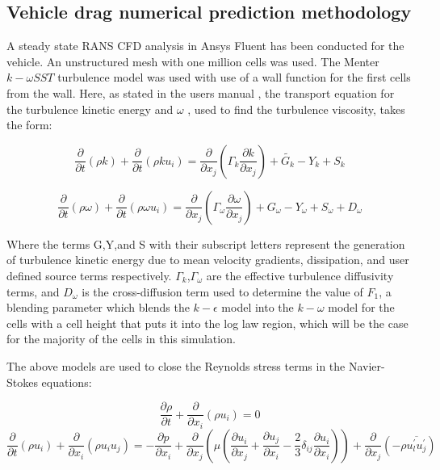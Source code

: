\subsection{Vehicle drag numerical prediction methodology}

A steady state RANS CFD analysis in Ansys Fluent has been conducted for the vehicle. An unstructured mesh with one million cells was used. The Menter $k-\omega SST$ turbulence model was used with use of a wall function for the first cells from the wall. Here, as stated in the users manual \cite{usrguide}, the transport equation for the turbulence kinetic energy and $\omega$ , used to find the turbulence viscosity, takes the form:

\begin{equation}
\frac{\partial}{\partial t}(\rho k)+\frac{\partial}{\partial t}\left(\rho k u_{i}\right)=\frac{\partial}{\partial x_{j}}\left(\Gamma_{k} \frac{\partial k}{\partial x_{j}}\right)+\widetilde{G_{k}}-Y_{k}+S_{k}
\end{equation}

\begin{equation}
\frac{\partial}{\partial t}(\rho \omega)+\frac{\partial}{\partial t}\left(\rho \omega u_{i}\right)=\frac{\partial}{\partial x_{j}}\left(\Gamma_{\omega} \frac{\partial \omega}{\partial x_{j}}\right)+G_{\omega}-Y_{\omega}+S_{\omega}+D_{\omega}
\end{equation}

Where the terms G,Y,and S with their subscript letters represent the generation of turbulence kinetic energy due to mean velocity gradients, dissipation, and user defined source terms respectively. $\Gamma_k$,$\Gamma_\omega$ are the effective turbulence diffusivity terms, and $D_\omega$ is the cross-diffusion term used to determine the value of $F_1$, a blending parameter which blends the $k-\epsilon$ model into the $k-\omega$ model for the cells with a cell height that puts it into the log law region, which will be the case for the majority of the cells in this simulation. 

The above models are used to close the Reynolds stress terms in the Navier-Stokes equations:

\begin{equation}
\frac{\partial \rho}{\partial t}+\frac{\partial}{\partial x_{i}}\left(\rho u_{i}\right)=0
\end{equation}
\begin{equation}
\frac{\partial}{\partial t}\left(\rho u_{i}\right)+\frac{\partial}{\partial x_{i}}\left(\rho u_{i} u_{j}\right)=-\frac{\partial p}{\partial x_{i}}+\frac{\partial}{\partial x_{j}}\left(\mu\left(\frac{\partial u_{i}}{\partial x_{j}}+\frac{\partial u_{j}}{\partial x_{i}}-\frac{2}{3} \delta_{i j} \frac{\partial u_{i}}{\partial x_{i}}\right)\right)+\frac{\partial}{\partial x_{j}}\left(-\rho \overline{u_{l}^{\prime} u_{j}^{\prime}}\right)
\end{equation}

